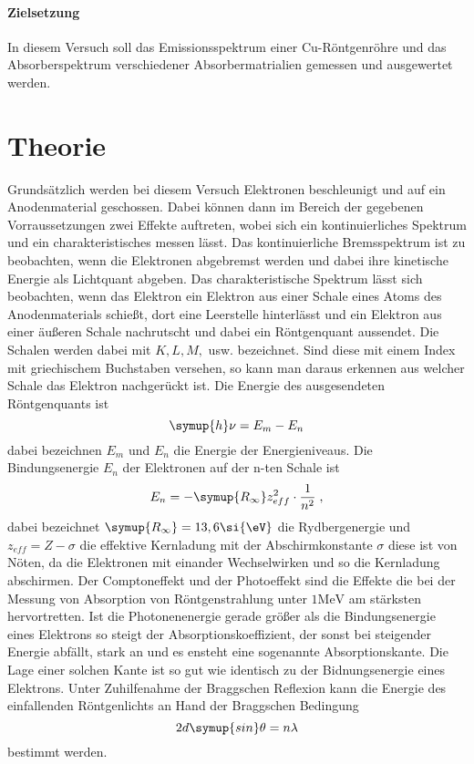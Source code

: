 
\paragraph{Zielsetzung}
In diesem Versuch soll das Emissionsspektrum einer Cu-Röntgenröhre und
das Absorberspektrum verschiedener Absorbermatrialien gemessen und ausgewertet
werden.

\section{Theorie}
\label{sec:Theorie}
Grundsätzlich werden bei diesem Versuch Elektronen beschleunigt und auf ein
Anodenmaterial geschossen. Dabei können dann im Bereich der gegebenen Vorraussetzungen
zwei Effekte auftreten, wobei sich ein kontinuierliches Spektrum und ein
charakteristisches messen lässt. Das kontinuierliche Bremsspektrum ist zu
beobachten, wenn die Elektronen abgebremst werden und dabei ihre kinetische
Energie als Lichtquant abgeben. Das charakteristische Spektrum lässt sich beobachten,
wenn das Elektron ein Elektron aus einer Schale eines Atoms des Anodenmaterials
schießt, dort eine Leerstelle hinterlässt und ein Elektron aus einer äußeren Schale
nachrutscht und dabei ein Röntgenquant aussendet. Die Schalen werden dabei mit
$K,L,M,$ usw. bezeichnet. Sind diese mit einem Index mit griechischem Buchstaben versehen,
so kann man daraus erkennen aus welcher Schale das Elektron nachgerückt ist.
Die Energie des ausgesendeten Röntgenquants ist
\begin{equation}
  \symup{h} \nu = E_m - E_n
  \label{eqn:erq}
\end{equation}
dabei bezeichnen $E_m$ und $E_n$ die Energie der Energieniveaus.
Die Bindungsenergie $E_n$ der Elektronen auf der n-ten Schale ist
\begin{equation}
  E_n = -\symup{R_\infty} z_{eff}^2 \cdot \frac{1}{n^2} \; ,
  \label{eqn:be}
\end{equation}
dabei bezeichnet $\symup{R_\infty} = 13,6 \si{\eV}$ die Rydbergenergie und
$z_{eff} = Z - \sigma $ die effektive Kernladung mit der Abschirmkonstante $\sigma$
diese ist von Nöten, da die Elektronen mit einander Wechselwirken und so die
Kernladung abschirmen.
Der Comptoneffekt und der Photoeffekt sind die Effekte die bei der Messung von
Absorption von Röntgenstrahlung unter $ 1 \si{\mega \eV}$ am stärksten
hervortretten. Ist die Photonenenergie gerade größer als die Bindungsenergie eines
Elektrons so steigt der Absorptionskoeffizient, der sonst bei steigender Energie
abfällt, stark an und es ensteht eine sogenannte Absorptionskante. Die Lage einer
solchen Kante ist so gut wie identisch zu der Bidnungsenergie eines Elektrons.
Unter Zuhilfenahme der Braggschen Reflexion kann die Energie des einfallenden
Röntgenlichts an Hand der Braggschen Bedingung
\begin{equation}
  2 d \symup{sin} \theta = n \lambda
  \label{eqn:bragg}
\end{equation}
bestimmt werden.
